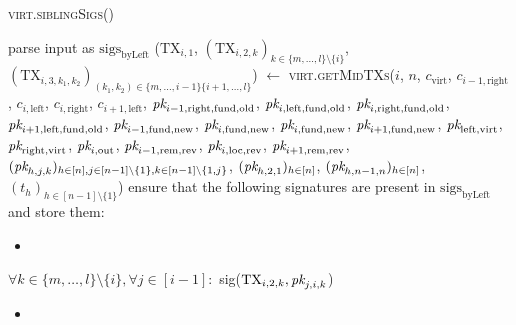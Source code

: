 \begin{center}
  \begin{processbox}{\textsc{virt.siblingSigs}()}
    \begin{algorithmic}[1]
      \State parse input as $\mathrm{sigs}_{\mathrm{byLeft}}$
      \State ($\mathrm{TX}_{i, 1}$, $(\mathrm{TX}_{i, 2, k})_{k \in \{m, \dots,
      l\} \setminus \{i\}}$, $(\mathrm{TX}_{i, 3, k_1, k_2})_{(k_1, k_2) \in
      \{m, \dots, i-1\} \{i+1, \dots, l\}}$) $\gets$
      \textsc{virt.getMidTXs}($i$, $n$, $c_{\mathrm{virt}}$, $c_{i-1,
      \mathrm{right}}$, $c_{i, \mathrm{left}}$, $c_{i, \mathrm{right}}$,
      $c_{i+1, \mathrm{left}}$, $\textit{pk}_{i-1, \mathrm{right}, \mathrm{fund},
      \mathrm{old}}$, $\textit{pk}_{i, \mathrm{left}, \mathrm{fund}, \mathrm{old}}$,
      $\textit{pk}_{i, \mathrm{right}, \mathrm{fund}, \mathrm{old}}$, $\textit{pk}_{i+1,
      \mathrm{left}, \mathrm{fund}, \mathrm{old}}$, $\textit{pk}_{i-1, \mathrm{fund},
      \mathrm{new}}$, $\textit{pk}_{i, \mathrm{fund}, \mathrm{new}}$, $\textit{pk}_{i,
      \mathrm{fund}, \mathrm{new}}$, $\textit{pk}_{i+1, \mathrm{fund}, \mathrm{new}}$,
      $\textit{pk}_{\mathrm{left}, \mathrm{virt}}$, $\textit{pk}_{\mathrm{right}, \mathrm{virt}}$,
      $\textit{pk}_{i, \mathrm{out}}$, $\textit{pk}_{i-1, \mathrm{rem}, \mathrm{rev}}$, $\textit{pk}_{i,
      \mathrm{loc}, \mathrm{rev}}$, $\textit{pk}_{i+1, \mathrm{rem}, \mathrm{rev}}$,
      $(\textit{pk}_{h,j,k})_{h \in [n], j \in [n-1] \setminus \{1\}, k \in [n-1]
      \setminus \{1, j\}}$, $(\textit{pk}_{h, 2, 1})_{h \in [n]}$, $(\textit{pk}_{h, n-1, n})_{h
      \in [n]}$, $(t_h)_{h \in [n-1] \setminus \{1\}}$)
      \Statex
      \State {}
      \State ensure that the following signatures are present in
      $\mathrm{sigs}_{\mathrm{byLeft}}$ and store them:
      \begin{itemize}
        \item {}
      \end{itemize}
      \Indent
        \State $\forall k \in \{m, \dots, l\} \setminus \{i\}, \forall j \in
        [i-1]:$
        \Indent
          \State sig($\mathrm{TX}_{i, 2, k}, \textit{pk}_{j, i, k}$)
        \EndIndent
      \EndIndent
      \begin{itemize}
        \item {}
      \end{itemize}

\end{algorithmic}
\end{processbox}
\end{center}
